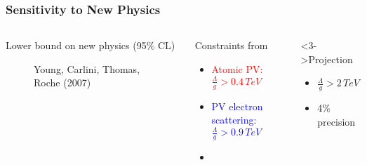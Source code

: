 \begin{frame}
 \frametitle{Sensitivity to New Physics}
 \abovedisplayskip=0pt
 \abovedisplayshortskip=0pt
 \begin{columns}[T]
   \begin{block}{Lower bound on new physics (95\% CL)}
    \begin{figure}
     \begin{center}
     \end{center}
     \caption{Young, Carlini, Thomas, Roche (2007)}
    \end{figure}
   \end{block}
   \begin{block}{Constraints from}
    \begin{itemize}
     \item<1-> \textcolor{red}{Atomic PV: \\ $\frac{\Lambda}{g} > 0.4\,TeV$}
     \item<2-> \textcolor{blue}{PV electron scattering: \\ $\frac{\Lambda}{g} > 0.9\,TeV$}
     \item<3->
    \end{itemize}
   \end{block}
   \begin{block}<3->{\textcolor{QweakGreen}{Projection \Qweak}}
    \begin{itemize}
     \item \textcolor{QweakGreen}{$\frac{\Lambda}{g} > 2\,TeV$}
     \item 4\% precision
    \end{itemize}
   \end{block}
 \end{columns}
\end{frame}
